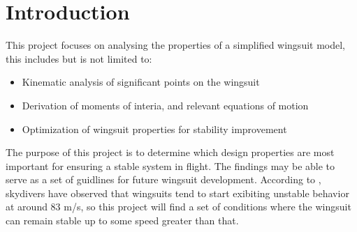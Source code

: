 \documentclass[11pt]{article}
\begin{document}
\section*{Introduction}
This project focuses on analysing the properties of a simplified wingsuit model, this includes but is not limited to:
\begin{itemize}
  \item Kinematic analysis of significant points on the wingsuit
  \item Derivation of moments of interia, and relevant equations of motion
  \item Optimization of wingsuit properties for stability improvement
\end{itemize}
The purpose of this project is to determine which design properties are most important for ensuring a stable system in flight.
The findings may be able to serve as a set of guidlines for future wingsuit development.
According to \cite{Sepahvand2020}, skydivers have observed that wingsuits tend to start exibiting unstable behavior at around 83 m/s, so this project will find a set of conditions where the wingsuit can remain stable up to some speed greater than that.

\end{document}
